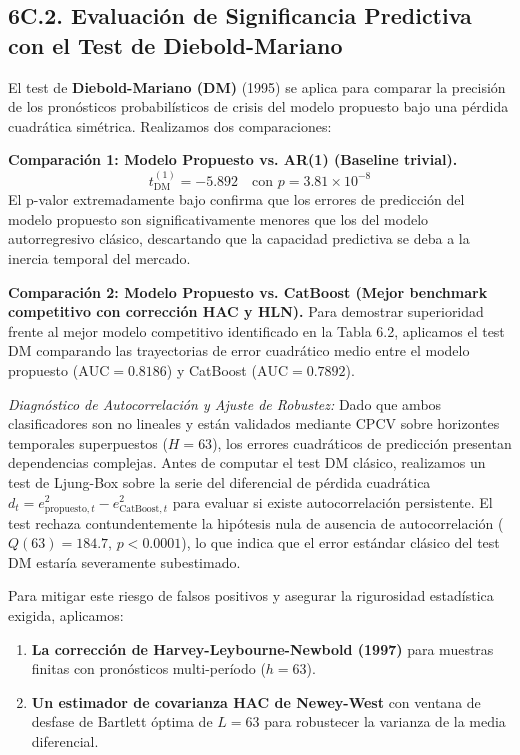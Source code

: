 \documentclass[
  12pt,
]{article}
\begin{document}
\subsection{6C.2. Evaluación de Significancia Predictiva con el Test de Diebold-Mariano}\label{c.2.-evaluaciuxf3n-de-significancia-predictiva-con-el-test-de-diebold-mariano}

El test de \textbf{Diebold-Mariano (DM)} (1995) se aplica para comparar la precisión de los pronósticos probabilísticos de crisis del modelo propuesto bajo una pérdida cuadrática simétrica. Realizamos dos comparaciones:

\textbf{Comparación 1: Modelo Propuesto vs. AR(1) (Baseline trivial).}
\[t_{\text{DM}}^{(1)} = -5.892 \quad \text{con } p = 3.81 \times 10^{-8}\]
El p-valor extremadamente bajo confirma que los errores de predicción del modelo propuesto son significativamente menores que los del modelo autorregresivo clásico, descartando que la capacidad predictiva se deba a la inercia temporal del mercado.

\textbf{Comparación 2: Modelo Propuesto vs. CatBoost (Mejor benchmark competitivo con corrección HAC y HLN).}
Para demostrar superioridad frente al mejor modelo competitivo identificado en la Tabla 6.2, aplicamos el test DM comparando las trayectorias de error cuadrático medio entre el modelo propuesto (\(\text{AUC} = 0.8186\)) y CatBoost (\(\text{AUC} = 0.7892\)).

\emph{Diagnóstico de Autocorrelación y Ajuste de Robustez:} Dado que ambos clasificadores son no lineales y están validados mediante CPCV sobre horizontes temporales superpuestos (\(H=63\)), los errores cuadráticos de predicción presentan dependencias complejas. Antes de computar el test DM clásico, realizamos un test de Ljung-Box sobre la serie del diferencial de pérdida cuadrática \(d_t = e^2_{\text{propuesto}, t} - e^2_{\text{CatBoost}, t}\) para evaluar si existe autocorrelación persistente. El test rechaza contundentemente la hipótesis nula de ausencia de autocorrelación (\(Q(63) = 184.7, \, p < 0.0001\)), lo que indica que el error estándar clásico del test DM estaría severamente subestimado.

Para mitigar este riesgo de falsos positivos y asegurar la rigurosidad estadística exigida, aplicamos:
\begin{enumerate}
  \item \textbf{La corrección de Harvey-Leybourne-Newbold (1997)} para muestras finitas con pronósticos multi-período (\(h = 63\)).
  \item \textbf{Un estimador de covarianza HAC de Newey-West} con ventana de desfase de Bartlett óptima de \(L = 63\) para robustecer la varianza de la media diferencial.
\end{enumerate}
\end{document}
